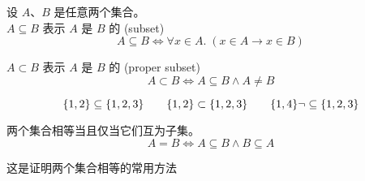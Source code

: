 \begin{frame}{}
  \begin{definition}[子集]
    设 $A$、$B$ 是任意两个集合。\\[8pt]

    $A \subseteq B$ 表示 $A$ 是 $B$ 的 (subset)
    \[
      A \subseteq B \iff \forall x \in A.\; (x \in A \to x \in B)
    \]

    $A \subset B$ 表示 $A$ 是 $B$ 的 (proper subset)
    \[
      A \subset B \iff A \subseteq B \land A \neq B
    \]
  \end{definition}

  \[
    \{1, 2\} \subseteq \{1, 2, 3\}
    \qquad \{1, 2\} \subset \{1, 2, 3\}
    \qquad \{1, 4\} \lnot\subseteq \{1, 2, 3\}
  \]
\end{frame}

\begin{frame}{}
  \begin{theorem}
    两个集合相等当且仅当它们互为子集。
    \[
      A = B \iff A \subseteq B \land B \subseteq A
    \]
  \end{theorem}

  \vspace{0.30cm}
  \begin{center}
    这是证明两个集合相等的常用方法
  \end{center}
\end{frame}
